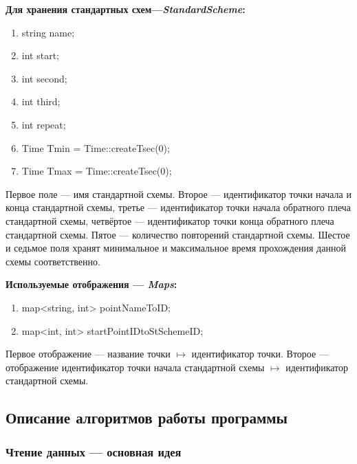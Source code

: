 \documentclass[12pt, a4 paper]{article}
\theoremstyle{plain}
\begin{document}

\textbf{Для хранения стандартных схем---\textit{StandardScheme}:}

\begin{enumerate}
	\item string name;
	\item int start;
	\item int second; 
	\item int third; 
	\item int repeat;
	\item Time Tmin = Time::createTsec(0);
	\item Time Tmax = Time::createTsec(0);
\end{enumerate}

Первое поле --- имя стандартной схемы. Второе --- идентификатор точки начала и конца стандартной схемы, третье --- идентификатор точки начала обратного плеча стандартной схемы, четвёртое --- идентификатор точки конца обратного плеча стандартной схемы. Пятое --- количество повторений стандартной схемы. Шестое и седьмое поля хранят минимальное и максимальное время прохождения данной схемы соответственно.


\textbf{Используемые отображения --- \textit{Maps}:}
\begin{enumerate}
	\item map<string, int> pointNameToID;
	\item map<int, int> startPointIDtoStSchemeID;
\end{enumerate}

Первое отображение --- название точки $\mapsto$ идентификатор точки. Второе --- отображение идентификатор точки начала стандартной схемы $\mapsto$ идентификатор стандартной схемы.

\newpage


\subsection{Описание алгоритмов работы программы}

\subsubsection{Чтение данных --- основная идея}
\end{document}
